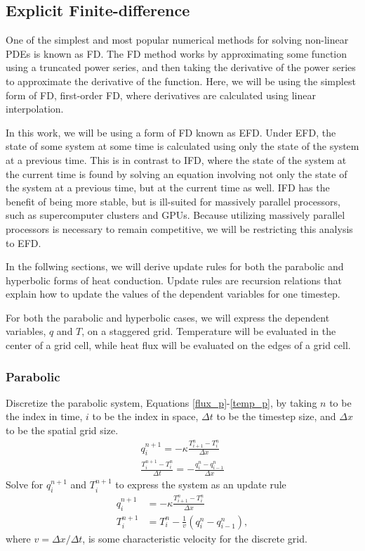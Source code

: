 \documentclass[iop]{emulateapj}
\begin{document}
		\subsection{Explicit Finite-difference}
		
			One of the simplest and most popular numerical methods for solving non-linear \acp{PDE} is known as \ac{FD}.
				The \ac{FD} method works by approximating some function using a truncated power series, and then taking the derivative of the power series to approximate the derivative of the function.
				Here, we will be using the simplest form of \ac{FD}, first-order \ac{FD}, where derivatives are calculated using linear interpolation.
				
			In this work, we will be using a form of \ac{FD} known as \ac{EFD}. 
				Under \ac{EFD}, the state of some system at some time is calculated using only the state of the system at a previous time. 
				This is in contrast to \ac{IFD}, where the state of the system at the current time is found by solving an equation involving not only the state of the system at a previous time, but at the current time as well.
				\ac{IFD} has the benefit of being more stable, but is ill-suited for massively parallel processors, such as supercomputer clusters and \acp{GPU}.
				Because utilizing massively parallel processors is necessary to remain competitive, we will be restricting this analysis to \ac{EFD}.
				
				In the follwing sections, we will derive update rules for both the parabolic and hyperbolic forms of heat conduction.
					Update rules are recursion relations that explain how to update the values of the dependent variables for one timestep.
					
				For both the parabolic and hyperbolic cases, we will express the dependent variables, $q$ and $T$, on a staggered grid.
					Temperature will be evaluated in the center of a grid cell, while heat flux will be evaluated on the edges of a grid cell.
		
			\subsubsection{Parabolic}
			
				Discretize the parabolic system, Equations \ref{flux_p}-\ref{temp_p}, by taking $n$ to be the index in time, $i$ to be the index in space, $\Delta t$ to be the timestep size, and $\Delta x$ to be the spatial grid size.
				\begin{gather}
					q_i^{n+1} = - \kappa \frac{T_{i+1}^n - T_i^n}{\Delta x} \label{q_par}\\
					\frac{T_i^{n+1} - T_i^n}{\Delta t} = - \frac{q_i^n - q_{i-1}^n}{\Delta x} \label{T_par}
				\end{gather}
				Solve for $q_i^{n+1}$ and $T_i^{n+1}$ to express the system as an update rule
				\begin{align}
						q_i^{n+1} &= - \kappa \frac{T_{i+1}^n - T_i^n}{\Delta x} \label{q_par_up}\\
						T_i^{n+1} &= T_i^n - \frac{1}{v} \left( q_i^n - q_{i-1}^n \right), \label{T_par_up}
				\end{align}
				where $v = \Delta x / \Delta t$, is some characteristic velocity for the discrete grid.
				
\end{document}

